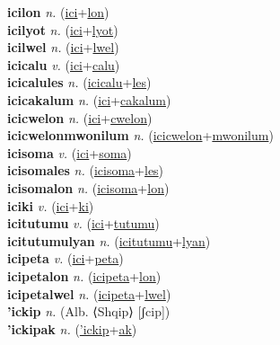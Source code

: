 \textbf{icilon} \textit{n.} (\hyperref[ici]{ici}+\hyperref[lon]{lon})
 \label{icilon} \\
\textbf{icilyot} \textit{n.} (\hyperref[ici]{ici}+\hyperref[lyot]{lyot})
 \label{icilyot} \\
\textbf{icilwel} \textit{n.} (\hyperref[ici]{ici}+\hyperref[lwel]{lwel})
 \label{icilwel} \\
\textbf{icicalu} \textit{v.} (\hyperref[ici]{ici}+\hyperref[calu]{calu})
 \label{icicalu} \\
\textbf{icicalules} \textit{n.} (\hyperref[icicalu]{icicalu}+\hyperref[les]{les})
 \label{icicalules} \\
\textbf{icicakalum} \textit{n.} (\hyperref[ici]{ici}+\hyperref[cakalum]{cakalum})
 \label{icicakalum} \\
\textbf{icicwelon} \textit{n.} (\hyperref[ici]{ici}+\hyperref[cwelon]{cwelon})
 \label{icicwelon} \\
\textbf{icicwelonmwonilum} \textit{n.} (\hyperref[icicwelon]{icicwelon}+\hyperref[mwonilum]{mwonilum})
 \label{icicwelonmwonilum} \\
\textbf{icisoma} \textit{v.} (\hyperref[ici]{ici}+\hyperref[soma]{soma})
 \label{icisoma} \\
\textbf{icisomales} \textit{n.} (\hyperref[icisoma]{icisoma}+\hyperref[les]{les})
 \label{icisomales} \\
\textbf{icisomalon} \textit{n.} (\hyperref[icisoma]{icisoma}+\hyperref[lon]{lon})
 \label{icisomalon} \\
\textbf{iciki} \textit{v.} (\hyperref[ici]{ici}+\hyperref[ki]{ki})
 \label{iciki} \\
\textbf{icitutumu} \textit{v.} (\hyperref[ici]{ici}+\hyperref[tutumu]{tutumu})
 \label{icitutumu} \\
\textbf{icitutumulyan} \textit{n.} (\hyperref[icitutumu]{icitutumu}+\hyperref[lyan]{lyan})
 \label{icitutumulyan} \\
\textbf{icipeta} \textit{v.} (\hyperref[ici]{ici}+\hyperref[peta]{peta})
 \label{icipeta} \\
\textbf{icipetalon} \textit{n.} (\hyperref[icipeta]{icipeta}+\hyperref[lon]{lon})
 \label{icipetalon} \\
\textbf{icipetalwel} \textit{n.} (\hyperref[icipeta]{icipeta}+\hyperref[lwel]{lwel})
 \label{icipetalwel} \\
\textbf{'ickip} \textit{n.} (Alb. ⟨Shqip⟩ [ʃcip])
 \label{'ickip} \\
\textbf{'ickipak} \textit{n.} (\hyperref['ickip]{'ickip}+\hyperref[ak]{ak})
 \label{'ickipak} \\
